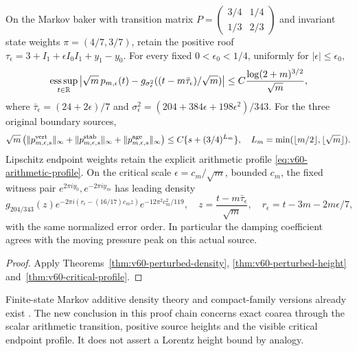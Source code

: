 \begin{leadtheorem}
\label{thm:intro-v60-perturbed}
On the Markov baker with transition matrix
$P=\left(\begin{smallmatrix}3/4&1/4\\1/3&2/3\end{smallmatrix}\right)$
and invariant state weights $\pi=(4/7,3/7)$, retain the positive roof
$\tau_\epsilon=3+I_1+\epsilon I_0I_1+y_1-y_0$.
For every fixed $0<\epsilon_0<1/4$, uniformly for
$|\epsilon|\le\epsilon_0$,
\[
 \operatorname*{ess\,sup}_{t\in\mathbb R}
 \left|\sqrt m\,p_{m,\epsilon}(t)
 -g_{\sigma_\epsilon^2}((t-m\bar\tau_\epsilon)/\sqrt m)\right|
 \le C\frac{\log(2+m)^{3/2}}{\sqrt m},
\]
where $\bar\tau_\epsilon=(24+2\epsilon)/7$ and
$\sigma_\epsilon^2=(204+384\epsilon+198\epsilon^2)/343$.
For the three original boundary sources,
\[
 \sqrt m\left(\|p_{m,\epsilon,s}^{\rm vert}\|_\infty
 +\|p_{m,\epsilon,s}^{\rm stab}\|_\infty
 +\|p_{m,\epsilon,s}^{\rm age}\|_\infty\right)
 \le C\{s+(3/4)^{L_m}\},\quad
 L_m=\min(\lfloor m/2\rfloor,\lfloor\sqrt m\rfloor).
\]
Lipschitz endpoint weights retain the explicit arithmetic profile
\eqref{eq:v60-arithmetic-profile}. On the critical scale
$\epsilon=c_m/\sqrt m$, bounded $c_m$, the fixed witness pair
$e^{2\pi iy_0},e^{-2\pi iy_m}$ has leading density
\[
 g_{204/343}(z)
 e^{-2\pi i(r_\epsilon-(16/17)c_mz)}e^{-12\pi^2c_m^2/119},
 \quad z=\frac{t-m\bar\tau_\epsilon}{\sqrt m},\quad
 r_\epsilon=t-3m-2m\epsilon/7,
\]
with the same normalized error order. In particular the damping
coefficient agrees with the moving pressure peak on this actual source.
\end{leadtheorem}
\begin{proof}
Apply Theorems~\ref{thm:v60-perturbed-density},
\ref{thm:v60-perturbed-height} and~\ref{thm:v60-critical-profile}.
\end{proof}

Finite-state Markov additive density theory and compact-family versions
already exist \cite{HL,HLuniform}. The new conclusion in this proof
chain concerns exact coarea through the scalar arithmetic transition,
positive source heights and the visible critical endpoint profile.
It does not assert a Lorentz height bound by analogy.

